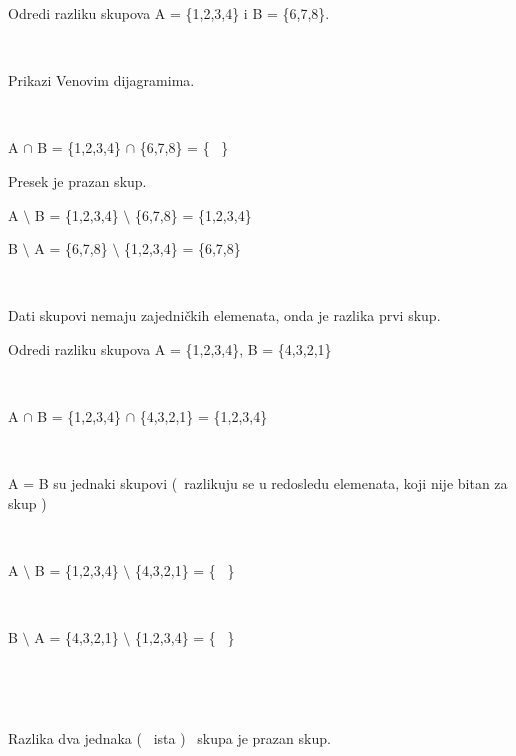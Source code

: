 \begin{zad}

    Odredi razliku skupova A = \{1,2,3,4\} i B = \{6,7,8\}. 

    \ 

    Prikazi Venovim dijagramima. 

    \ 



    A $\cap$ B = \{1,2,3,4\} $\cap$ \{6,7,8\} = \{ \ \} 



    Presek je prazan skup. 



\begin{figure}[h] 

        \center


        \caption{}

\end{figure}

    



    A $\setminus$ B = \{1,2,3,4\} $\setminus$ \{6,7,8\} = \{1,2,3,4\} 



    B $\setminus$ A = \{6,7,8\} $\setminus$ \{1,2,3,4\} = \{6,7,8\} 

    \ 



    Dati skupovi nemaju zajedni\v ckih elemenata, onda je razlika prvi skup.



\end{zad}

\begin{zad}

    Odredi razliku skupova A = \{1,2,3,4\}, B = \{4,3,2,1\}

    \ 



    A $\cap$ B = \{1,2,3,4\} $\cap$ \{4,3,2,1\} = \{1,2,3,4\}

    \ 



    A = B su jednaki skupovi (\ razlikuju se u redosledu elemenata, koji nije bitan za skup )\ 

    \ 



    A $\setminus$ B = \{1,2,3,4\} $\setminus$ \{4,3,2,1\} = \{ \ \} 

    \ 



    B $\setminus$ A = \{4,3,2,1\} $\setminus$ \{1,2,3,4\} = \{ \ \}

    \ 

    \ 

    Razlika dva jednaka ( \ ista ) \ skupa je prazan skup.

    \

\end{zad}

